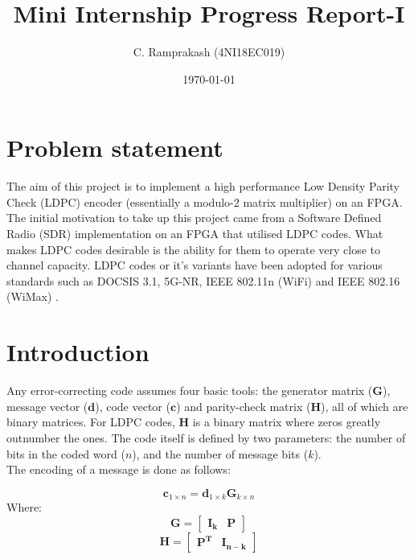 \documentclass[a4paper,12pt]{article}
\begin{document}
\title{Mini Internship Progress Report-I}
\author{C. Ramprakash (4NI18EC019)}
\date{\today}
\maketitle

\section{Problem statement}
The aim of this project is to implement a high performance Low Density
Parity Check (LDPC) \cite{gallager1962} encoder (essentially a modulo-2 matrix
multiplier) on an FPGA. The initial motivation to take up this project came
from a Software Defined Radio (SDR) implementation on an FPGA \cite{lpsdr_isc}
that utilised LDPC codes. What makes LDPC codes desirable is the ability for
them to operate very close to channel capacity. LDPC codes or it's variants
have been adopted for various standards such as DOCSIS 3.1, 5G-NR, IEEE 802.11n (WiFi) and
IEEE 802.16 (WiMax) \cite{ldpcwebdemo}.

\section{Introduction}
Any error-correcting code assumes four basic tools: the generator matrix
($\boldsymbol{G}$), message vector
($\boldsymbol{d}$), code vector
($\boldsymbol{c}$) and parity-check matrix
($\boldsymbol{H}$), all of which are binary matrices. For
LDPC codes, \begin{math}\boldsymbol{H}\end{math} is a binary matrix where zeros
greatly outnumber the ones. The code itself is defined by two parameters: the
number of bits in the coded word ($n$), and the number of message bits ($k$).\\
The encoding of a message is done as follows:

\begin{equation}\label{eq:coding}
    \boldsymbol{c}_{1 \times n} = \boldsymbol{d}_{1 \times k}\boldsymbol{G}_{k \times n}
\end{equation}
Where:
\begin{equation}\label{eq:generator}
    \boldsymbol{G} = \left[\begin{array}{c|c}\boldsymbol{I_{k}}&\boldsymbol{P}\end{array}\right]
\end{equation}
\begin{equation}\label{eq:pcheck}
    \boldsymbol{H} = \left[\begin{array}{c|c}\boldsymbol{P^T}&\boldsymbol{I_{n-k}}\end{array}\right]
\end{equation}
\end{document}
